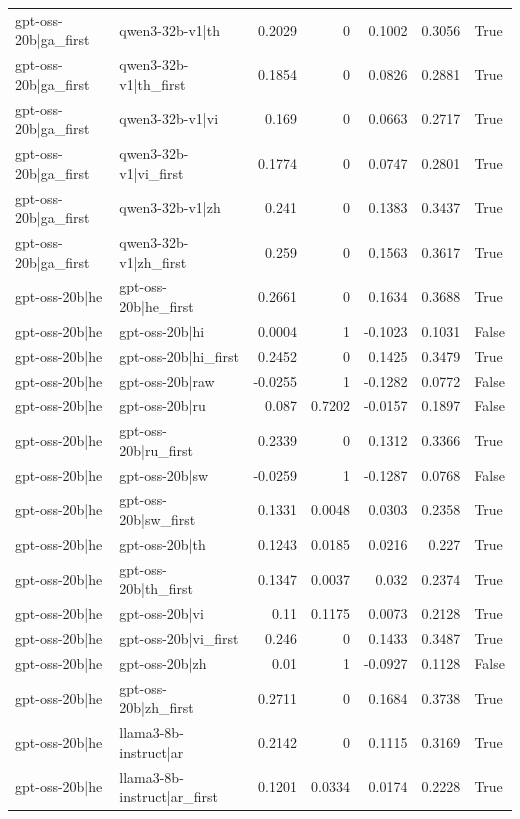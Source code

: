 \begin{table}
\begin{tabular}{l l r r r r l}
gpt-oss-20b|ga_first & qwen3-32b-v1|th & 0.2029 & 0 & 0.1002 & 0.3056 & True \\
gpt-oss-20b|ga_first & qwen3-32b-v1|th_first & 0.1854 & 0 & 0.0826 & 0.2881 & True \\
gpt-oss-20b|ga_first & qwen3-32b-v1|vi & 0.169 & 0 & 0.0663 & 0.2717 & True \\
gpt-oss-20b|ga_first & qwen3-32b-v1|vi_first & 0.1774 & 0 & 0.0747 & 0.2801 & True \\
gpt-oss-20b|ga_first & qwen3-32b-v1|zh & 0.241 & 0 & 0.1383 & 0.3437 & True \\
gpt-oss-20b|ga_first & qwen3-32b-v1|zh_first & 0.259 & 0 & 0.1563 & 0.3617 & True \\
gpt-oss-20b|he & gpt-oss-20b|he_first & 0.2661 & 0 & 0.1634 & 0.3688 & True \\
gpt-oss-20b|he & gpt-oss-20b|hi & 0.0004 & 1 & -0.1023 & 0.1031 & False \\
gpt-oss-20b|he & gpt-oss-20b|hi_first & 0.2452 & 0 & 0.1425 & 0.3479 & True \\
gpt-oss-20b|he & gpt-oss-20b|raw & -0.0255 & 1 & -0.1282 & 0.0772 & False \\
gpt-oss-20b|he & gpt-oss-20b|ru & 0.087 & 0.7202 & -0.0157 & 0.1897 & False \\
gpt-oss-20b|he & gpt-oss-20b|ru_first & 0.2339 & 0 & 0.1312 & 0.3366 & True \\
gpt-oss-20b|he & gpt-oss-20b|sw & -0.0259 & 1 & -0.1287 & 0.0768 & False \\
gpt-oss-20b|he & gpt-oss-20b|sw_first & 0.1331 & 0.0048 & 0.0303 & 0.2358 & True \\
gpt-oss-20b|he & gpt-oss-20b|th & 0.1243 & 0.0185 & 0.0216 & 0.227 & True \\
gpt-oss-20b|he & gpt-oss-20b|th_first & 0.1347 & 0.0037 & 0.032 & 0.2374 & True \\
gpt-oss-20b|he & gpt-oss-20b|vi & 0.11 & 0.1175 & 0.0073 & 0.2128 & True \\
gpt-oss-20b|he & gpt-oss-20b|vi_first & 0.246 & 0 & 0.1433 & 0.3487 & True \\
gpt-oss-20b|he & gpt-oss-20b|zh & 0.01 & 1 & -0.0927 & 0.1128 & False \\
gpt-oss-20b|he & gpt-oss-20b|zh_first & 0.2711 & 0 & 0.1684 & 0.3738 & True \\
gpt-oss-20b|he & llama3-8b-instruct|ar & 0.2142 & 0 & 0.1115 & 0.3169 & True \\
gpt-oss-20b|he & llama3-8b-instruct|ar_first & 0.1201 & 0.0334 & 0.0174 & 0.2228 & True \\

\end{tabular}
\end{table}
